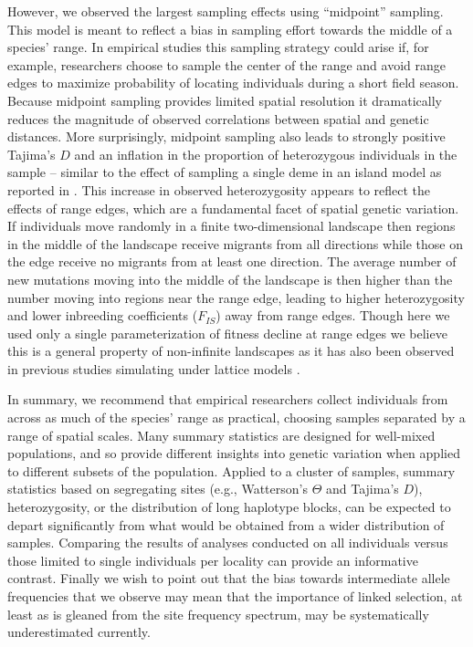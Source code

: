 \documentclass[10pt,twoside,lineno,hidelinks]{preprint}
\begin{document}
However, we observed the largest sampling effects using ``midpoint'' sampling.
This model is meant to reflect a bias in sampling effort towards the middle of a species' range. 
In empirical studies this sampling strategy could arise if, for example, 
researchers choose to sample the center of the range and avoid range edges to maximize probability of locating individuals during a short field season. 
Because midpoint sampling provides limited spatial resolution it dramatically reduces the magnitude of observed correlations between spatial and genetic distances. 
More surprisingly, midpoint sampling also leads to strongly positive Tajima's $D$ and an inflation in the proportion of heterozygous individuals in the sample -- similar to the effect of sampling a single deme in an island model as reported in \citep{Stadler2009}. 
This increase in observed heterozygosity appears to reflect the effects of range edges, which are a fundamental facet of spatial genetic variation. 
If individuals move randomly in a finite two-dimensional landscape then regions in the middle of the landscape receive migrants from all directions while those on the edge receive no migrants from at least one direction. The average number of new mutations moving into the middle of the landscape is then higher than the number moving into regions near the range edge, leading to higher heterozygosity and lower inbreeding coefficients ($F_{IS}$) away from range edges. Though here we used only a single parameterization of fitness decline at range edges we believe this is a general property of non-infinite landscapes as it has also been observed in previous studies simulating under lattice models \citep{Neel2013,Shirk2014}. 

In summary, 
we recommend that empirical researchers collect individuals from across as much of the species' range as practical,
choosing samples separated by a range of spatial scales.
Many summary statistics are designed for well-mixed populations,
and so provide different insights into genetic variation
when applied to different subsets of the population.
Applied to a cluster of samples, summary statistics based on segregating sites 
(e.g., Watterson's $\Theta$ and Tajima's $D$), 
heterozygosity, or the distribution of long haplotype blocks, 
can be expected to depart significantly from what would be obtained from a wider distribution of samples.
Comparing the results of analyses conducted on all individuals versus those limited to single individuals per locality 
can provide an informative contrast. Finally we wish to point out that the bias towards intermediate allele frequencies that we observe may mean that the importance of linked selection, at least as is gleaned from the site frequency spectrum, may be systematically underestimated currently.
\end{document}
